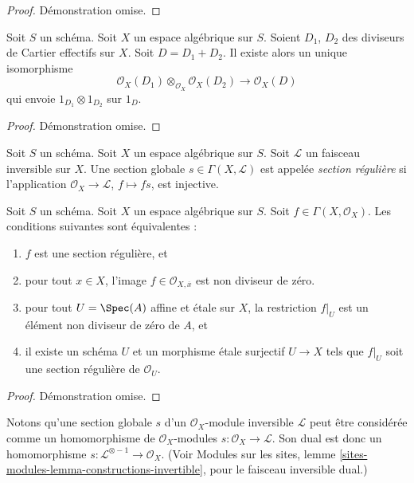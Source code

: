 \begin{proof}
Démonstration omise.
\end{proof}

\begin{lemma}
\label{lemma-invertible-sheaf-sum-effective-Cartier-divisors}
Soit $S$ un schéma. Soit $X$ un espace algébrique sur $S$.
Soient $D_1$, $D_2$ des diviseurs de Cartier effectifs sur $X$.
Soit $D = D_1 + D_2$.
Il existe alors un unique isomorphisme
$$
\mathcal{O}_X(D_1) \otimes_{\mathcal{O}_X} \mathcal{O}_X(D_2)
\longrightarrow
\mathcal{O}_X(D)
$$
qui envoie $1_{D_1} \otimes 1_{D_2}$ sur $1_D$.
\end{lemma}

\begin{proof}
Démonstration omise.
\end{proof}

\begin{definition}
\label{definition-regular-section}
Soit $S$ un schéma. Soit $X$ un espace algébrique sur $S$.
Soit $\mathcal{L}$ un faisceau inversible sur $X$.
Une section globale $s \in \Gamma(X, \mathcal{L})$ est appelée
{\it section régulière} si l'application $\mathcal{O}_X \to \mathcal{L}$,
$f \mapsto fs$, est injective.
\end{definition}

\begin{lemma}
\label{lemma-regular-section-structure-sheaf}
Soit $S$ un schéma.
Soit $X$ un espace algébrique sur $S$.
Soit $f \in \Gamma(X, \mathcal{O}_X)$.
Les conditions suivantes sont équivalentes :
\begin{enumerate}
\item $f$ est une section régulière, et
\item pour tout $x \in X$, l'image $f \in \mathcal{O}_{X, \overline{x}}$
est non diviseur de zéro.
\item pour tout $U = \Spec(A)$ affine et \'etale sur $X$,
la restriction $f|_U$ est un élément non diviseur de zéro de $A$, et
\item il existe un schéma $U$ et un morphisme \'etale surjectif
$U \to X$ tels que $f|_U$ soit une section régulière de $\mathcal{O}_U$.
\end{enumerate}
\end{lemma}

\begin{proof}
Démonstration omise.
\end{proof}

\noindent
Notons qu'une section globale $s$ d'un $\mathcal{O}_X$-module inversible
$\mathcal{L}$ peut être considérée comme un homomorphisme de $\mathcal{O}_X$-modules
$s : \mathcal{O}_X \to \mathcal{L}$. Son dual est donc un
homomorphisme $s : \mathcal{L}^{\otimes -1} \to \mathcal{O}_X$.
(Voir Modules sur les sites, lemme \ref{sites-modules-lemma-constructions-invertible},
pour le faisceau inversible dual.)

